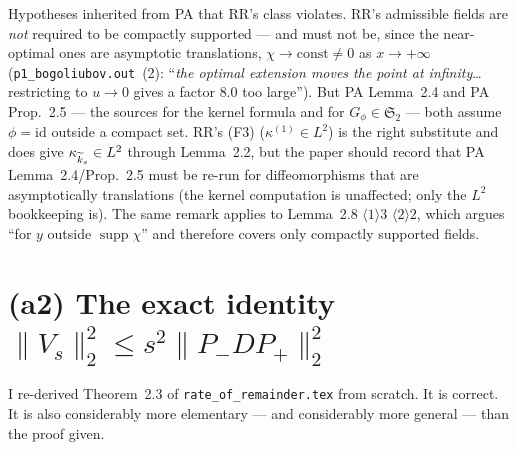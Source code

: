 \documentclass[11pt]{article}
\newcommand{\Stwo}{\mathfrak S_2}\newcommand{\Sone}{\mathfrak S_1}
\newcommand{\Pp}{P_+}\newcommand{\Pm}{P_-}\newcommand{\Om}{\Omega}\newcommand{\one}{\mathbf 1}
\newcommand{\norm}[1]{\lVert#1\rVert}\newcommand{\abs}[1]{\lvert#1\rvert}
\begin{document}
\begin{verdictgap}
Hypotheses inherited from PA that RR's class violates.  RR's admissible fields are \emph{not}
required to be compactly supported --- and must not be, since the near-optimal ones are
asymptotic translations, $\chi\to\text{const}\ne0$ as $x\to+\infty$
(\texttt{p1\_bogoliubov.out}~(2): ``\emph{the optimal extension moves the point at infinity}\ldots
restricting to $u\to0$ gives a factor $8.0$ too large'').  But PA Lemma~2.4 and PA Prop.~2.5 --- the
sources for the kernel formula and for $G_\phi\in\Stwo$ --- both assume $\phi=\mathrm{id}$ outside a
compact set.  RR's (F3) ($\kappa^{(1)}\in L^2$) is the right substitute and does give
$\kappa_{\widetilde k_s}\in L^2$ through Lemma~2.2, but the paper should record that PA Lemma~2.4/Prop.~2.5
must be re-run for diffeomorphisms that are asymptotically translations (the kernel computation is
unaffected; only the $L^2$ bookkeeping is).  The same remark applies to Lemma~2.8
$\langle1\rangle3$ $\langle2\rangle2$, which argues ``for $y$ outside $\operatorname{supp}\chi$''
and therefore covers only compactly supported fields.
\end{verdictgap}

\section{(a2) The exact identity $\norm{V_s}_2^2\le s^2\norm{\Pm D\Pp}_2^2$}\label{sec:a2}

I re-derived Theorem~2.3 of \texttt{rate\_of\_remainder.tex} from scratch.  It is correct.  It is
also considerably more elementary --- and considerably more general --- than the proof given.
\end{document}
